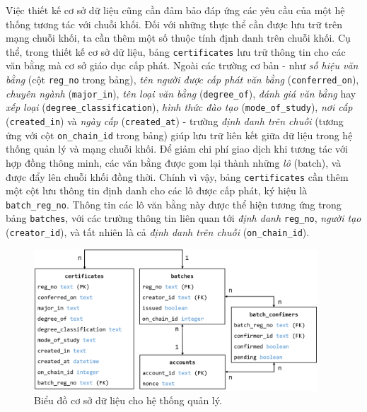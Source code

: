 Việc thiết kế cơ sở dữ liệu cũng cần đảm bảo đáp ứng các yêu cầu của một hệ thống tương tác với chuỗi khối. Đối với những thực thể cần được lưu trữ trên mạng chuỗi khối, ta cần thêm một số thuộc tính định danh trên chuỗi khối. Cụ thể, trong thiết kế cơ sở dữ liệu, bảng \texttt{certificates} lưu trữ thông tin cho các văn bằng mà cơ sở giáo dục cấp phát. Ngoài các trường cơ bản - như \textit{số hiệu văn bằng} (cột \texttt{reg\_no} trong bảng), \textit{tên người được cấp phát văn bằng} (\texttt{conferred\_on}), \textit{chuyên ngành} (\texttt{major\_in}), \textit{tên loại văn bằng} (\texttt{degree\_of}), \textit{đánh giá văn bằng} hay \textit{xếp loại} (\texttt{degree\_classification}), \textit{hình thức đào tạo} (\texttt{mode\_of\_study}), \textit{nơi cấp} (\texttt{created\_in}) và \textit{ngày cấp} (\texttt{created\_at}) - trường \textit{định danh trên chuỗi} (tương ứng với cột \texttt{on\_chain\_id} trong bảng) giúp lưu trữ liên kết giữa dữ liệu trong hệ thống quản lý và mạng chuỗi khối. Để giảm chi phí giao dịch khi tương tác với hợp đồng thông minh, các văn bằng được gom lại thành những \textit{lô} (batch), và được đẩy lên chuỗi khối đồng thời. Chính vì vậy, bảng \texttt{certificates} cần thêm một cột lưu thông tin định danh cho các lô được cấp phát, ký hiệu là \texttt{batch\_reg\_no}. Thông tin các lô văn bằng này được thể hiện tương ứng trong bảng \texttt{batches}, với các trường thông tin liên quan tới \textit{định danh} \texttt{reg\_no}, \textit{người tạo} (\texttt{creator\_id}), và tất nhiên là cả \textit{định danh trên chuỗi} (\texttt{on\_chain\_id}).\\

\begin{figure}[!ht]
    \centering
    \includegraphics[width=400px]{anh/giai-phap/database.png}
    \caption{Biểu đồ cơ sở dữ liệu cho hệ thống quản lý.}
\end{figure}

